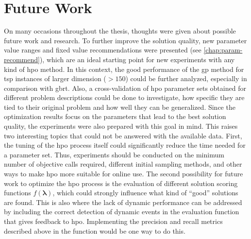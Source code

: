 \section{Future Work}

On many occasions throughout the thesis, thoughts were given about possible future work and research. 
To further improve the solution quality, new parameter value ranges and fixed value recommendations were presented (see \cref{chap:param-recommend}), which are an ideal starting point for new experiments with any kind of \gls{hpo} method. In this context, the good performance of the \gls{gp} method for \gls{tsp} instances of larger dimension ($>150$) could be further analyzed, especially in comparison with \gls{gbrt}. Also, a cross-validation of \gls{hpo} parameter sets obtained for different problem descriptions could be done to investigate, how specific they are tied to their original problem and how well they can be generalized. 
Since the optimization results focus on the parameters that lead to the best solution quality, the experiments were also prepared with this goal in mind. This raises two interesting topics that could not be answered with the available data. First, the tuning of the \gls{hpo} process itself could significantly reduce the time needed for a parameter set. Thus, experiments should be conducted on the minimum number of objective calls required, different initial sampling methods, and other ways to make \gls{hpo} more suitable for online use. The second possibility for future work to optimize the \gls{hpo} process is the evaluation of different solution scoring functions $f(\mathbf{\lambda})$, which could strongly influence what kind of \enquote{good} solutions are found. 
This is also where the lack of dynamic performance can be addressed by including the correct detection of dynamic events in the evaluation function that gives feedback to \gls{hpo}. Implementing the precision and recall metrics described above in the function would be one way to do this.

